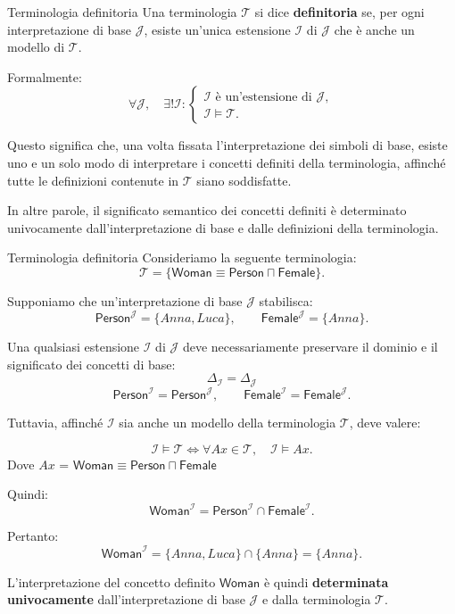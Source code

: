 \newpage
\begin{definition}{Terminologia definitoria}
    Una terminologia $\mathcal{T}$ si dice \textbf{definitoria}
    se, per ogni interpretazione di base $\mathcal{J}$,
    esiste un'unica estensione $\mathcal{I}$ di $\mathcal{J}$
    che è anche un modello di $\mathcal{T}$.

    Formalmente:
    \[
        \forall \mathcal{J}, \quad
        \exists! \mathcal{I} :
        \begin{cases}
            \mathcal{I} \text{ è un'estensione di } \mathcal{J},\\
            \mathcal{I} \models \mathcal{T}.
        \end{cases}
    \]

    Questo significa che, una volta fissata l'interpretazione
    dei simboli di base, esiste uno e un solo modo di
    interpretare i concetti definiti della terminologia,
    affinché tutte le definizioni contenute in $\mathcal{T}$
    siano soddisfatte.

    In altre parole, il significato semantico dei concetti
    definiti è determinato univocamente dall'interpretazione
    di base e dalle definizioni della terminologia.
\end{definition}

\begin{example}{Terminologia definitoria}
    Consideriamo la seguente terminologia:
    \[
        \mathcal{T} =
        \{\mathsf{Woman} \equiv
        \mathsf{Person} \sqcap \mathsf{Female}\}.
    \]

    Supponiamo che un'interpretazione di base $\mathcal{J}$
    stabilisca:
    \[
        \mathsf{Person}^{\mathcal{J}} = \{Anna,Luca\},
        \qquad
        \mathsf{Female}^{\mathcal{J}} = \{Anna\}.
    \]

    Una qualsiasi estensione $\mathcal{I}$ di $\mathcal{J}$
    deve necessariamente preservare il dominio e il
    significato dei concetti di base:
    \[
        \Delta_{\mathcal{I}} = \Delta_{\mathcal{J}}
    \]
    \[
        \mathsf{Person}^{\mathcal{I}} =
        \mathsf{Person}^{\mathcal{J}},
        \qquad
        \mathsf{Female}^{\mathcal{I}} =
        \mathsf{Female}^{\mathcal{J}}.
    \]

    Tuttavia, affinché $\mathcal{I}$ sia anche un modello
    della terminologia $\mathcal{T}$, deve valere:

    \[
    \mathcal{I} \models \mathcal{T}
    \iff
    \forall Ax \in \mathcal{T}, \quad
    \mathcal{I} \models Ax.
    \]
    Dove $Ax$ = $\mathsf{Woman} \equiv
        \mathsf{Person} \sqcap \mathsf{Female}$

    
    Quindi:
    \[
        \mathsf{Woman}^{\mathcal{I}} =
        \mathsf{Person}^{\mathcal{I}} \cap
        \mathsf{Female}^{\mathcal{I}}.
    \]

    Pertanto:
    \[
        \mathsf{Woman}^{\mathcal{I}} =
        \{Anna,Luca\} \cap \{Anna\} = \{Anna\}.
    \]

    L'interpretazione del concetto definito
    $\mathsf{Woman}$ è quindi \textbf{determinata
    univocamente} dall'interpretazione di base
    $\mathcal{J}$ e dalla terminologia $\mathcal{T}$.
\end{example}

